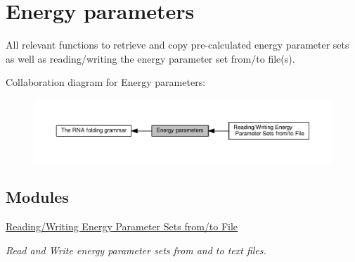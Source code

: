 \hypertarget{group__energy__parameters}{}\section{Energy parameters}
\label{group__energy__parameters}


All relevant functions to retrieve and copy pre-\/calculated energy parameter sets as well as reading/writing the energy parameter set from/to file(s).  


Collaboration diagram for Energy parameters\+:
\nopagebreak
\begin{figure}[H]
\begin{center}
\leavevmode
\includegraphics[width=350pt]{group__energy__parameters}
\end{center}
\end{figure}
\subsection*{Modules}
\begin{DoxyCompactItemize}
\item 
\hyperlink{group__energy__parameters__rw}{Reading/\+Writing Energy Parameter Sets from/to File}
\begin{DoxyCompactList}\small\item\em Read and Write energy parameter sets from and to text files. \end{DoxyCompactList}\end{DoxyCompactItemize}
